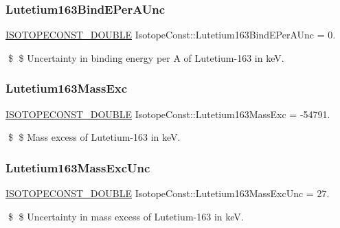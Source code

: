 \subsubsection{\texorpdfstring{Lutetium163\+Bind\+E\+Per\+A\+Unc}{Lutetium163BindEPerAUnc}}
{\footnotesize\ttfamily \mbox{\hyperlink{group___isotope_const-_macros_ga8f45a7272ce02c0b4c65c44636ed719a}{I\+S\+O\+T\+O\+P\+E\+C\+O\+N\+S\+T\+\_\+\+D\+O\+U\+B\+LE}} Isotope\+Const\+::\+Lutetium163\+Bind\+E\+Per\+A\+Unc = 0.}

\$ \$ Uncertainty in binding energy per A of Lutetium-\/163 in keV. \mbox{\label{group___isotope_const-_lutetium-_lu163_ga9c179411796db01c929cadeea27537b1}} 
\subsubsection{\texorpdfstring{Lutetium163\+Mass\+Exc}{Lutetium163MassExc}}
{\footnotesize\ttfamily \mbox{\hyperlink{group___isotope_const-_macros_ga8f45a7272ce02c0b4c65c44636ed719a}{I\+S\+O\+T\+O\+P\+E\+C\+O\+N\+S\+T\+\_\+\+D\+O\+U\+B\+LE}} Isotope\+Const\+::\+Lutetium163\+Mass\+Exc = -\/54791.}

\$ \$ Mass excess of Lutetium-\/163 in keV. \mbox{\label{group___isotope_const-_lutetium-_lu163_gad4874ca88bfdcd8fdf7afe51a57aa98d}} 
\subsubsection{\texorpdfstring{Lutetium163\+Mass\+Exc\+Unc}{Lutetium163MassExcUnc}}
{\footnotesize\ttfamily \mbox{\hyperlink{group___isotope_const-_macros_ga8f45a7272ce02c0b4c65c44636ed719a}{I\+S\+O\+T\+O\+P\+E\+C\+O\+N\+S\+T\+\_\+\+D\+O\+U\+B\+LE}} Isotope\+Const\+::\+Lutetium163\+Mass\+Exc\+Unc = 27.}

\$ \$ Uncertainty in mass excess of Lutetium-\/163 in keV. \mbox{\label{group___isotope_const-_lutetium-_lu163_ga13cb7f4f0274a21c65e0bd7b9f508bfa}} 

